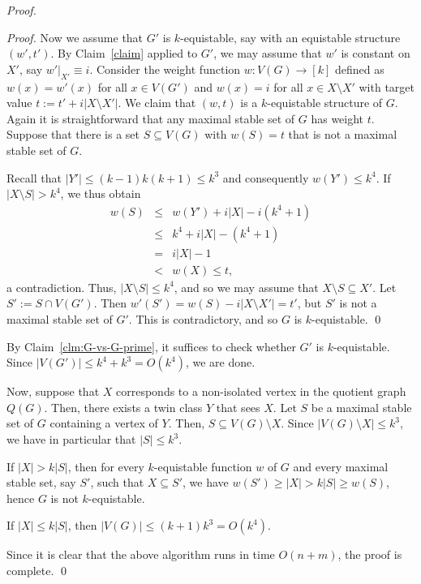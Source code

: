\documentclass{llncs}
\begin{document}
\begin{proof}
\begin{proof}
Now we assume that $G'$ is $k$-equistable, say with an equistable structure $(w',t')$.
By Claim~\ref{claim} applied to $G'$, we may assume that $w'$ is constant on $X'$, say $w'|_{X'} \equiv i$.
Consider the weight function $w:V(G)\to[k]$ defined as $w(x) = w'(x)$ for all $x\in V(G')$ and $w(x) = i$ for all $x\in X\setminus X'$ with target
value $t:=t'+i|X \setminus X'|$. We claim that $(w,t)$ is a $k$-equistable structure of $G$.
Again it is straightforward that any maximal stable set of $G$ has weight $t$.
Suppose that there is a set $S \subseteq V(G)$ with $w(S)=t$ that is not a maximal stable set of $G$.

Recall that $|Y'| \le (k-1)k(k+1) \le k^3$ and consequently $w(Y')\le k^4$.
If $|X \setminus S| > k^4$, we thus obtain
\begin{eqnarray*}
w(S) &\le& w(Y') + i|X|-i(k^4+1)  \\
  &\le& k^4 + i |X| - (k^4+1)\\
  &=& i|X|-1\\
  &<& w(X) \le t,
\end{eqnarray*}
a contradiction.
Thus, $|X \setminus S| \le k^4$, and so we may assume that $X \setminus S \subseteq X'$.
Let $S' := S \cap V(G')$.
Then $w'(S') = w(S) - i|X \setminus X'| = t'$, but $S'$ is not a maximal stable set of $G'$.
This is contradictory, and so $G$ is $k$-equistable.
\qed \end{proof}

By Claim~\ref{clm:G-vs-G-prime}, it suffices to check whether $G'$ is $k$-equistable.
Since $|V(G')|\le k^4+k^3 = O(k^4)$, we are done.

\bigskip
\begin{sloppypar}
Now, suppose that $X$ corresponds to a non-isolated vertex in the quotient graph $Q(G)$.
Then, there exists a twin class $Y$ that sees $X$.
Let $S$ be a maximal stable set of $G$ containing a vertex of $Y$.
Then, $S\subseteq V(G)\setminus X$. Since
\hbox{$|V(G)\setminus X|\le k^3$}, we have in particular
that $|S|\le k^3$.
\end{sloppypar}

If $|X|>k|S|$, then
for every $k$-equistable function $w$ of $G$ and
every maximal stable set, say $S'$, such that $X\subseteq S'$, we have
$w(S')\ge |X|>k|S|\ge w(S)$, hence $G$ is not $k$-equistable.

If $|X|\le k|S|$, then $|V(G)|\le (k+1)k^3 = O(k^4)$.

Since it is clear that the above algorithm runs in time $O(n+m)$, the proof is complete.
\qed \end{proof}
\end{document}
